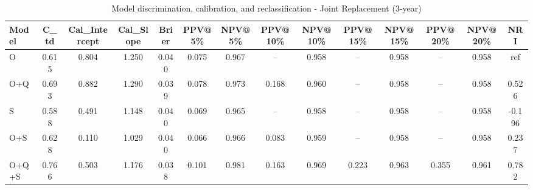 \begin{table}[htbp]
\centering
\small
\caption{Model discrimination, calibration, and reclassification - Joint Replacement (3-year)}
\label{tab:perf_joint_3y}
\begin{tabular}{lccccccccccccc}
\toprule
Model & C\_td & Cal\_Intercept & Cal\_Slope & Brier & PPV@5\% & NPV@5\% & PPV@10\% & NPV@10\% & PPV@15\% & NPV@15\% & PPV@20\% & NPV@20\% & NRI \\
\midrule
O & 0.615 & 0.804 & 1.250 & 0.040 & 0.075 & 0.967 & -- & 0.958 & -- & 0.958 & -- & 0.958 & ref \\
O+Q & 0.693 & 0.882 & 1.290 & 0.039 & 0.078 & 0.973 & 0.168 & 0.960 & -- & 0.958 & -- & 0.958 & 0.526 \\
S & 0.588 & 0.491 & 1.148 & 0.040 & 0.069 & 0.965 & -- & 0.958 & -- & 0.958 & -- & 0.958 & -0.196 \\
O+S & 0.628 & 0.110 & 1.029 & 0.040 & 0.066 & 0.966 & 0.083 & 0.959 & -- & 0.958 & -- & 0.958 & 0.237 \\
O+Q+S & 0.766 & 0.503 & 1.176 & 0.038 & 0.101 & 0.981 & 0.163 & 0.969 & 0.223 & 0.963 & 0.355 & 0.961 & 0.782 \\
\bottomrule
\end{tabular}
\end{table}